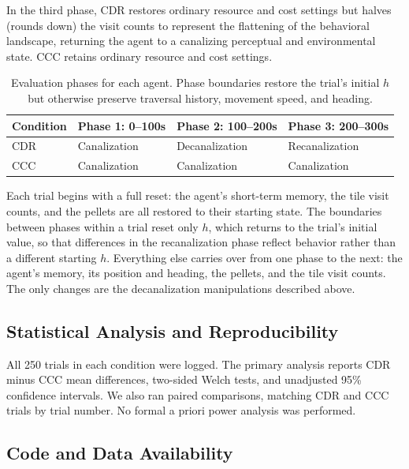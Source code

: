 \documentclass[12pt,fleqn]{article}
\begin{document}
In the third phase, CDR restores ordinary resource and cost settings but halves (rounds down) the visit counts to represent the flattening of the behavioral landscape, returning the agent to a canalizing perceptual and environmental state. CCC retains ordinary resource and cost settings.

\begin{table}[H]
\centering\small
\begin{tabular}{@{}llll@{}}
\toprule
Condition & Phase 1: 0--100s & Phase 2: 100--200s & Phase 3: 200--300s\\
\midrule
CDR & Canalization & Decanalization & Recanalization\\
CCC & Canalization & Canalization & Canalization\\
\bottomrule
\end{tabular}
\caption{Evaluation phases for each agent. Phase boundaries restore the trial's initial $h$ but otherwise preserve traversal history, movement speed, and heading.}
\label{tab:trial-phases}
\end{table}

Each trial begins with a full reset: the agent's short-term memory, the tile visit counts, and the pellets are all restored to their starting state. The boundaries between phases within a trial reset only $h$, which returns to the trial's initial value, so that differences in the recanalization phase reflect behavior rather than a different starting $h$. Everything else carries over from one phase to the next: the agent's memory, its position and heading, the pellets, and the tile visit counts. The only changes are the decanalization manipulations described above.

\subsection{Statistical Analysis and Reproducibility}\label{sec:stats}

All 250 trials in each condition were logged. The primary analysis reports CDR minus CCC mean differences, two-sided Welch tests, and unadjusted 95\% confidence intervals. We also ran paired comparisons, matching CDR and CCC trials by trial number. No formal a priori power analysis was performed.

\subsection{Code and Data Availability}
\end{document}
